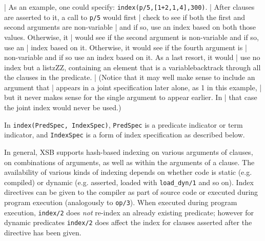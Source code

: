\begin{description}
{| As an example, one could specify: {\tt index(p/5,[1+2,1,4],300)}.
| After clauses are asserted to it, a call to {\tt p/5} would first
| check to see if both the first and second arguments are non-variable
| and if so, use an index based on both those values. Otherwise, it
| would see if the second argument is non-variable and if so, use an
| index based on it. Otherwise, it would see if the fourth argument is
| non-variable and if so use an index based on it. As a last resort, it would
| use no index but a listzZZ, containing an element that is a variablebacktrack through all the clauses in the predicate.
| (Notice that it may well make sense to include an argument that 
| appears in a joint specification later alone, as 1 in this example,
| but it never makes sense for the single argument to appear earlier. In
| that case the joint index would never be used.)

}

\label{index_dynamic} 
%
In {\tt index(PredSpec, IndexSpec)}, {\tt PredSpec} is a predicate
indicator or term indicator, and {\tt IndexSpec} is a form of index
specification as described below.

In general, XSB supports hash-based indexing on various arguments of
clauses, on combinations of arguments, as well as within the arguments
of a clause.  The availability of various kinds of indexing depends on
whether code is static (e.g. compiled) or dynamic (e.g. asserted,
loaded with {\tt load\_dyn/1} and so on).  Index directives can be
given to the compiler as part of source code or executed during
program execution (analogously to {\tt op/3}).  When executed during
program execution, {\tt index/2} does {\em not\/} re-index an already
existing predicate; however for dynamic predicates {\tt index/2} does
affect the index for clauses asserted after the directive has been
given.


\end{description}
